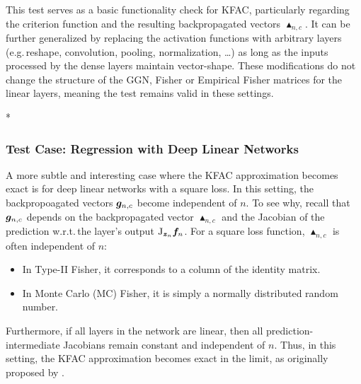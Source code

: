 This test serves as a basic functionality check for KFAC, particularly regarding the criterion function and the resulting backpropagated vectors $\blacktriangle_{n,c}$.
It can be further generalized by replacing the activation functions with arbitrary layers (e.g.\,reshape, convolution, pooling, normalization, \dots) as long as the inputs processed by the dense layers maintain vector-shape.
These modifications do not change the structure of the GGN, Fisher or Empirical Fisher matrices for the linear layers, meaning the test remains valid in these settings.


\switchcolumn[1]*
\switchcolumn[0]

\subsubsection{Test Case: Regression with Deep Linear Networks}

A more subtle and interesting case where the KFAC approximation becomes exact is for deep linear networks with a square loss. 
In this setting, the backpropoagated vectors ${\bm{g}}_{n,c}$ become independent of $n$.
To see why, recall that ${\bm{g}}_{n,c}$ depends on the backpropagated vector $\blacktriangle_{n,c}$ and the Jacobian of the prediction w.r.t.\,the layer's output $\mathrm{J}_{{\bm{z}}_n} {\bm{f}}_n$.
For a square loss function, $\blacktriangle_{n,c}$ is often independent of $n$: 
\begin{itemize}
\item In Type-II Fisher, it corresponds to a column of the identity matrix.
\item In Monte Carlo (MC) Fisher, it is simply a normally distributed random number.
\end{itemize}
Furthermore, if all layers in the network are linear, then all prediction-intermediate Jacobians remain constant and independent of $n$. 
Thus, in this setting, the KFAC approximation becomes exact in the limit, as originally proposed by \cite{bernacchia2018exact}.

